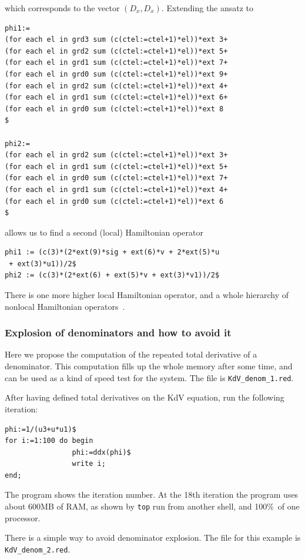 which corresponds to the vector $(D_x,D_x)$.  Extending the ansatz to
\begin{verbatim}
phi1:=
(for each el in grd3 sum (c(ctel:=ctel+1)*el))*ext 3+
(for each el in grd2 sum (c(ctel:=ctel+1)*el))*ext 5+
(for each el in grd1 sum (c(ctel:=ctel+1)*el))*ext 7+
(for each el in grd0 sum (c(ctel:=ctel+1)*el))*ext 9+
(for each el in grd2 sum (c(ctel:=ctel+1)*el))*ext 4+
(for each el in grd1 sum (c(ctel:=ctel+1)*el))*ext 6+
(for each el in grd0 sum (c(ctel:=ctel+1)*el))*ext 8
$

phi2:=
(for each el in grd2 sum (c(ctel:=ctel+1)*el))*ext 3+
(for each el in grd1 sum (c(ctel:=ctel+1)*el))*ext 5+
(for each el in grd0 sum (c(ctel:=ctel+1)*el))*ext 7+
(for each el in grd1 sum (c(ctel:=ctel+1)*el))*ext 4+
(for each el in grd0 sum (c(ctel:=ctel+1)*el))*ext 6
$
\end{verbatim}
allows us to find a second (local) Hamiltonian operator
\begin{verbatim}
phi1 := (c(3)*(2*ext(9)*sig + ext(6)*v + 2*ext(5)*u
 + ext(3)*u1))/2$
phi2 := (c(3)*(2*ext(6) + ext(5)*v + ext(3)*v1))/2$
\end{verbatim}
There is one more higher local Hamiltonian operator, and a whole hierarchy of
nonlocal Hamiltonian operators~\cite{KerstenKrasilshchikVerboretsky:2004}.


\subsubsection{Explosion of denominators and how to avoid it}

Here we propose the computation of the repeated total derivative of a
denominator. This computation fills up the whole memory after some time, and
can be used as a kind of speed test for the system. The file is
\texttt{KdV\_denom\_1.red}.

After having defined total derivatives on the KdV equation, run the following
iteration:
\begin{verbatim}
phi:=1/(u3+u*u1)$
for i:=1:100 do begin
                phi:=ddx(phi)$
                write i;
end;
\end{verbatim}
The program shows the iteration number. At the 18th iteration the program uses
about 600MB of RAM, as shown by \texttt{top} run from another shell, and 100\%\
of one processor.

There is a simple way to avoid denominator explosion. The file for this example is
\texttt{KdV\_denom\_2.red}.

